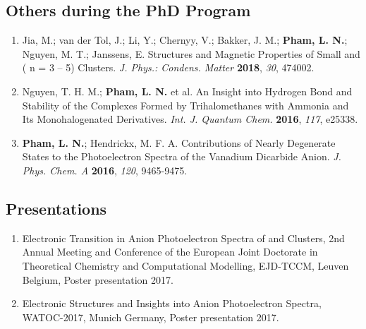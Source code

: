 \subsection*{Others during the PhD Program}


\begin{enumerate}
    \item Jia, M.; van der Tol, J.; Li, Y.; Chernyy, V.; Bakker, J. M.; \textbf{Pham, L. N.}; Nguyen, M. T.; Janssens, E. Structures and Magnetic Properties of Small  and  ( n = 3 -- 5) Clusters. \textit{J. Phys.: Condens. Matter} \textbf{2018}, \textit{30}, 474002.
    \item Nguyen, T. H. M.; \textbf{Pham, L. N.} et al. An Insight into  Hydrogen Bond and Stability of the Complexes Formed by Trihalomethanes with Ammonia and Its Monohalogenated Derivatives. \textit{Int. J. Quantum Chem.} \textbf{2016}, \textit{117}, e25338.
    \item \textbf{Pham, L. N.}; Hendrickx, M. F. A. Contributions of Nearly Degenerate States to the Photoelectron Spectra of the Vanadium Dicarbide Anion. \textit{J. Phys. Chem. A} \textbf{2016}, \textit{120}, 9465-9475.
\end{enumerate}




\subsection*{Presentations}

\begin{enumerate}
	\item Electronic Transition in Anion Photoelectron Spectra of  and  Clusters, 2nd Annual Meeting and Conference of the European Joint Doctorate in Theoretical Chemistry and Computational Modelling, EJD-TCCM, Leuven Belgium, Poster presentation 2017.
	\item Electronic Structures and Insights into Anion Photoelectron Spectra, WATOC-2017, Munich Germany, Poster presentation 2017.
\end{enumerate}



